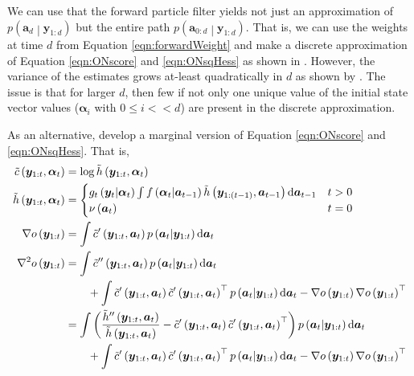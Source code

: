 \documentclass[notitlepage]{article}
\renewcommand{\vec}[1]{\bm{#1}}
\newcommand{\Lparen}[1]{\left( #1\right)}
\newcommand{\Cond}[2]{ #1 \middle\vert  #2}
\newcommand*\diff{\mathop{}\!\mathrm{d}}
\newcommand{\optor}[2]{#1\Lparen{#2}}
\newcommand{\optorC}[3]{\optor{#1}{\Cond{#2}{#3}}}
\begin{document}
We can use that the forward particle filter yields not just an approximation of 
$\optorC{p}{\vec a_{d}}{\vec y_{1:d}}$ but the entire path 
$\optorC{p}{\vec a_{0:d}}{\vec y_{1:d}}$. That is, we can use the weights at time 
$d$ from Equation \eqref{eqn:forwardWeight} and make a discrete approximation 
of Equation \eqref{eqn:ONscore} and \eqref{eqn:ONsqHess} as shown in \cite{cappe05}. 
However, the variance of the estimates grows at-least quadratically in $d$ as shown 
by \cite{poyiadjis11}. The issue is that for larger $d$, 
then few if not only one unique value 
of the initial state vector values ($\vec\alpha_i$ with $0\leq i <\!\!< d$) 
are present in the discrete approximation.  

As an alternative, \cite{poyiadjis11} develop a marginal 
version of Equation \eqref{eqn:ONscore} and \eqref{eqn:ONsqHess}. 
That is,  %
%
\begin{align}
\tilde c\Lparen{\vec y_{1:t}, \vec\alpha_t} &= 
	\log\tilde h\Lparen{\vec y_{1:t}, \vec\alpha_t} \nonumber\\
%
\tilde h\Lparen{\vec y_{1:t}, \vec\alpha_t} &=
	\begin{cases} 
	\optorC{g_t}{\vec y_t}{\vec\alpha_t}	
	\int 
	\optorC{f}{\vec\alpha_t}{\vec a_{t - 1}}	
	\tilde h\Lparen{\vec y_{1:(t - 1)}, \vec a_{t- 1}}\diff\vec a_{t-1} & t > 0 \\
	\nu\Lparen{\vec a_{t}} & t = 0
	\end{cases}	
	\label{eqn:scoreNSqArg2} \\
%
\nabla o\Lparen{\vec y_{1:t}}
&= \int \tilde c'\Lparen{\vec y_{1:t}, \vec a_t}\optorC{p}{\vec a_t}{\vec y_{1:t}}
	\diff\vec a_t \label{eqn:scoreNsq}\\
%
\nabla^2 o\Lparen{\vec y_{1:t}}
&= \int \tilde c''\Lparen{\vec y_{1:t}, \vec a_t}\optorC{p}{\vec a_t}{\vec y_{1:t}}
	\diff\vec a_t \nonumber\\
&\hspace{20pt}+\int 
	\tilde c'\Lparen{\vec y_{1:t}, \vec a_t}
    \tilde c'\Lparen{\vec y_{1:t}, \vec a_t}^\top
	\optorC{p}{\vec a_t}{\vec y_{1:t}}\diff\vec a_t 
	- \nabla o\Lparen{\vec y_{1:t}}
	 \nabla o\Lparen{\vec y_{1:t}}^\top \nonumber\\
%
&= \int \Lparen{
	\frac{%
	\tilde h''\Lparen{\vec y_{1:t}, \vec a_t}}{
	\tilde h  \Lparen{\vec y_{1:t}, \vec a_t}}
	- \tilde c'\Lparen{\vec y_{1:t}, \vec a_t}
      \tilde c'\Lparen{\vec y_{1:t}, \vec a_t}^\top}
	\optorC{p}{\vec a_t}{\vec y_{1:t}}
	\diff\vec a_t \label{eqn:hessNsq}\\
&\hspace{20pt}+\int 
	\tilde c'\Lparen{\vec y_{1:t}, \vec a_t}
    \tilde c'\Lparen{\vec y_{1:t}, \vec a_t}^\top
	\optorC{p}{\vec a_t}{\vec y_{1:t}}\diff\vec a_t 
	- \nabla o\Lparen{\vec y_{1:t}}
	 \nabla o\Lparen{\vec y_{1:t}}^\top \nonumber
\end{align}
\end{document}
